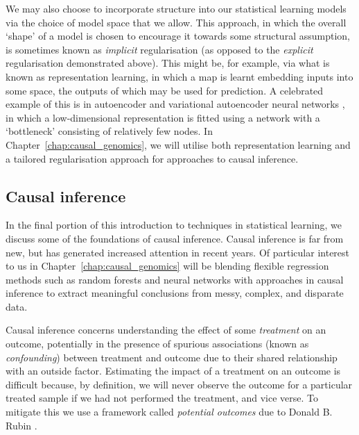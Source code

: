 \documentclass[thesis.tex]{subfiles}
\begin{document}
We may also choose to incorporate structure into our statistical learning models via the choice of model space that we allow. This approach, in which the overall `shape' of a model is chosen to encourage it towards some structural assumption, is sometimes known as \emph{implicit} regularisation (as opposed to the \emph{explicit} regularisation demonstrated above). This might be, for example, via what is known as representation learning, in which a map is learnt embedding inputs into some space, the outputs of which may be used for prediction. A celebrated example of this is in autoencoder and variational autoencoder neural networks \citep{lecun_phd_1987, kingma_auto-encoding_2013}, in which a low-dimensional representation is fitted using a network with a `bottleneck' consisting of relatively few nodes. In Chapter~\ref{chap:causal_genomics}, we will utilise both representation learning and a tailored regularisation approach for approaches to causal inference.

\subsection{Causal inference} \label{sec:causal_inference}
In the final portion of this introduction to techniques in statistical learning, we discuss some of the foundations of causal inference. Causal inference is far from new, but has generated increased attention in recent years. Of particular interest to us in Chapter~\ref{chap:causal_genomics} will be blending flexible regression methods such as random forests and neural networks with approaches in causal inference to extract meaningful conclusions from messy, complex, and disparate data.

Causal inference concerns understanding the effect of some \emph{treatment} on an outcome, potentially in the presence of spurious associations (known as \emph{confounding}) between treatment and outcome due to their shared relationship with an outside factor. Estimating the impact of a treatment on an outcome is difficult because, by definition, we will never observe the outcome for a particular treated sample if we had not performed the treatment, and vice verse. To mitigate this we use a framework called \emph{potential outcomes} due to Donald B. Rubin \citep{rubin_estimating_1974, rubin_causal_2005}.
\end{document}
